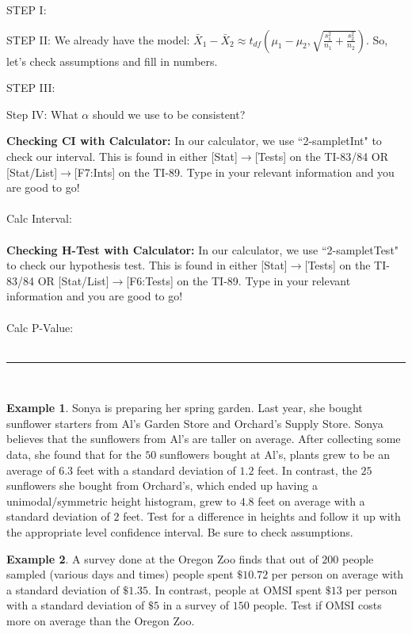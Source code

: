 \documentclass[12pt]{amsart}
\theoremstyle{definition}
\newtheorem{ex}{Example}
\begin{document}
STEP I:

\vspace{0.5in}

STEP II: We already have the model: $\bar{X}_1-\bar{X}_2\approx t_{df}\left( \mu_1-\mu_2, \sqrt{\frac{s_1^2}{n_1}+\frac{s_2^2}{n_2}}\right)$. So, let's check assumptions and fill in numbers.

\vspace{1in}

STEP III:

\vfill

Step IV: What $\alpha$ should we use to be consistent?
\vspace{0.5in}

\newpage
\noindent \textbf{Checking CI with Calculator:} In our calculator, we use ``2-sampletInt" to check our interval. This is found in either [Stat]$\rightarrow$[Tests] on the TI-83/84 OR [Stat/List]$\rightarrow$[F7:Ints] on the TI-89. Type in your relevant information and you are good to go!\\
~\\
Calc Interval:\\
~\\
\noindent \textbf{Checking H-Test with Calculator:} In our calculator, we use ``2-sampletTest" to check our hypothesis test. This is found in either [Stat]$\rightarrow$[Tests] on the TI-83/84 OR [Stat/List]$\rightarrow$[F6:Tests] on the TI-89. Type in your relevant information and you are good to go!\\
~\\
Calc P-Value:\\
~\\
\hrule
~\\
\begin{ex}
 Sonya is preparing her spring garden. Last year, she bought sunflower starters from Al's Garden Store and Orchard's Supply Store. Sonya believes that the sunflowers from Al's are taller on average. After collecting some data, she found that for the $50$ sunflowers bought at Al's, plants grew to be an average of $6.3$ feet with a standard deviation of $1.2$ feet. In contrast, the $25$ sunflowers she bought from Orchard's, which ended up having a unimodal/symmetric height histogram, grew to $4.8$ feet on average with a standard deviation of $2$ feet. Test for a difference in heights and follow it up with the appropriate level confidence interval. Be sure to check assumptions.
\end{ex}
\vfill
\newpage
\begin{ex}
	A survey done at the Oregon Zoo finds that out of $200$ people sampled (various days and times) people spent $\$10.72$ per person on average with a standard deviation of $\$1.35$. In contrast, people at OMSI spent $\$13$ per person with a standard deviation of $\$5$ in a survey of $150$ people. Test if OMSI costs more on average than the Oregon Zoo.
\end{ex}
\end{document}
